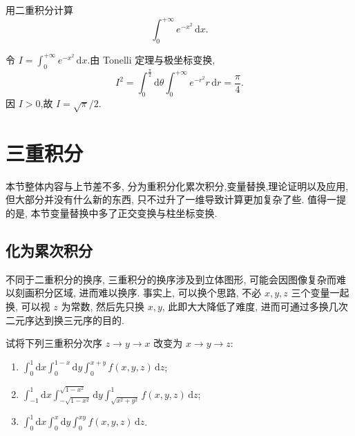 \begin{example}[\markstar]
    用二重积分计算
    \[
        \displaystyle\int_0^{+\infty}e^{-x^2}\,\mathrm{d}x.
    \]
\end{example}
\exampleblank

\begin{solution}
    令 $I=\displaystyle\int_0^{+\infty}e^{-x^2}\,\mathrm{d}x$.由 Tonelli 定理与极坐标变换,
    \[
        I^2=\int_0^{\frac{\pi}{2}}\!\mathrm{d}\theta\int_0^{+\infty}e^{-r^2}r\,\mathrm{d}r
        =\dfrac{\pi}{4}.
    \]
    因 $I>0$,故 $I=\sqrt\pi/2$.
\end{solution}


\newpage

\section{三重积分}

本节整体内容与上节差不多, 分为重积分化累次积分,变量替换,理论证明以及应用, 但大部分并没有什么新的东西, 只不过升了一维导致计算更加复杂了些. 值得一提的是, 本节变量替换中多了正交变换与柱坐标变换.



\subsection{化为累次积分}

不同于二重积分的换序, 三重积分的换序涉及到立体图形, 可能会因图像复杂而难以刻画积分区域, 进而难以换序. 事实上, 可以换个思路, 不必 $x,y,z$ 三个变量一起换, 可以视 $z$ 为常数, 然后先只换 $x,y$, 此即大大降低了难度, 进而可通过多换几次二元序达到换三元序的目的.

\begin{example}[\markstar]
    试将下列三重积分次序 $z\to y\to x$ 改变为 $x\to y\to z$:
    \begin{enumerate}
        \item $\displaystyle\int_0^1\mathrm{d}x\int_0^{1-x}\mathrm{d}y\int_0^{x+y}f(x,y,z)\,\mathrm{d}z$;
        \item $\displaystyle\int_{-1}^1\mathrm{d}x\int_{-\sqrt{1-x^2}}^{\sqrt{1-x^2}}\mathrm{d}y\int_{\sqrt{x^2+y^2}}^1f(x,y,z)\,\mathrm{d}z$;
        \item $\displaystyle\int_0^1\mathrm{d}x\int_0^x\mathrm{d}y\int_0^{xy}f(x,y,z)\,\mathrm{d}z$.
    \end{enumerate}
\end{example}
\exampleblank

